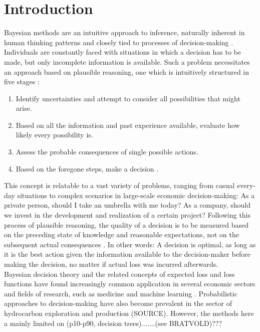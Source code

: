 \chapter{Introduction} \label{chap:intro}
Bayesian methods are an intuitive approach to inference, naturally inherent in human thinking patterns and closely tied to processes of decision-making \citep{berger2013stat, davidson2015, jaynes1986bayesian}. Individuals are constantly faced with situations in which a decision has to be made, but only incomplete information is available. Such a problem necessitates an approach based on plausible reasoning, one which is intuitively structured in five stages \cite{jaynes1986bayesian}:
\begin{enumerate}
	\item Identify uncertainties and attempt to consider all possibilities that might arise.
	\item Based on all the information and past experience available, evaluate how likely every possibility is.
	\item Assess the probable consequences of single possible actions.
	\item Based on the foregone steps, make a decision \citep{jaynes1986bayesian}.
\end{enumerate}
This concept is relatable to a vast variety of problems, ranging from casual every-day situations to complex scenarios in large-scale economic decision-making: As a private person, should I take an umbrella with me today? As a company, should we invest in the development and realization of a certain project? Following this process of plausible reasoning, the quality of a decision is to be measured based on the preceding state of knowledge and reasonable expectations, not on the subsequent actual consequences \citep{jaynes1986bayesian}. In other words: A decision is optimal, as long as it is the best action given the information available to the decision-maker before making the decision, no matter if actual loss was incurred afterwards.\\
Bayesian decision theory and the related concepts of expected loss and loss functions have found increasingly common application in several economic sectors and fields of research, such as medicine \citep{ashby2000evidence, ashby2006bayesian, moye2006statistical} and machine learning \citep{barber2012bayesian, theodoridis2015machine}. Probabilistic approaches to decision-making have also become prevalent in the sector of hydrocarbon exploration and production (SOURCE). However, the methods here a mainly limited on (p10-p90, decision trees).......(see BRATVOLD)???\\
